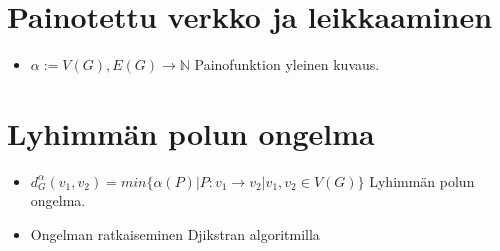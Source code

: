 \begin{itemize}
  \end{itemize}

\section{Painotettu verkko ja leikkaaminen} \label{ch:09_painotettu_verkko_ja_leikkaaminen}

  \begin{itemize}
    \item \(\alpha := V(G), E(G) \rightarrow \mathbb{N}\) Painofunktion yleinen kuvaus.
  \end{itemize}

\section{Lyhimmän polun ongelma} \label{ch:09_lyhimman_polun_ongelma}

  \begin{itemize}
    \item \(d_G^\alpha(v_1, v_2) = min\{\alpha(P) | P:v_1 \rightarrow v_2 | v_1, v_2 \in V(G)\}\) Lyhimmän polun ongelma.
    \item Ongelman ratkaiseminen Djikstran algoritmilla
  \end{itemize}

